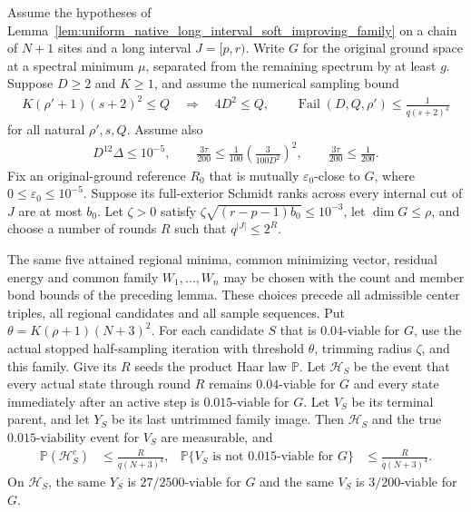 \begin{lemma}
    \label{lem:physical_soft_interval_history}
    \leanok
    Assume the hypotheses of
    Lemma~\ref{lem:uniform_native_long_interval_soft_improving_family}
    on a chain of $N+1$ sites and a long interval $J=[p,r)$.
    Write $G$ for the original ground space at a spectral minimum $\mu$,
    separated from the remaining spectrum by at least $g$.
    Suppose $D\ge2$ and $K\ge1$, and assume the numerical sampling bound
    \begin{align}
        K(\rho'+1)(s+2)^2\le Q\quad\Longrightarrow\quad
        4D^2\le Q,\qquad
        \operatorname{Fail}(D,Q,\rho')\le\frac{1}{q(s+2)^4}
        \label{eq:physical_interval_sampling_threshold}
    \end{align}
    for all natural $\rho',s,Q$. Assume also
    \begin{align}
        D^{12}\Delta\le10^{-5},\qquad
        \frac{3\tau}{200}\le
        \frac1{100}\left(\frac{3}{100D^2}\right)^2,
        \qquad \frac{3\tau}{200}\le\frac1{200}.
    \end{align}
    Fix an original-ground reference $R_0$ that is mutually
    $\varepsilon_0$-close to $G$, where
    $0\le\varepsilon_0\le10^{-5}$. Suppose its full-exterior Schmidt ranks
    across every internal cut of $J$ are at most $b_0$.
    Let $\zeta>0$ satisfy
    $\zeta\sqrt{(r-p-1)b_0}\le10^{-3}$, let $\dim G\le\rho$,
    and choose a number of rounds $R$ such that
    $q^{|J|}\le2^R$.

    The same five attained regional minima, common minimizing vector,
    residual energy and common family $W_1,\ldots,W_n$ may be chosen
    with the count and member bond bounds of the preceding lemma.
    These choices precede all admissible center triples, all regional
    candidates and all sample sequences. Put
    $\theta=K(\rho+1)(N+3)^2$. For each candidate $S$ that is
    $0.04$-viable for $G$, use the actual stopped half-sampling iteration
    with threshold $\theta$, trimming radius $\zeta$, and this family.
    Give its $R$ seeds the product Haar law $\mathbb P$.
    Let $\mathcal H_S$ be the event that every actual state through
    round $R$ remains $0.04$-viable for $G$ and every state immediately
    after an active step is $0.015$-viable for $G$. Let $V_S$ be its terminal
    parent, and let $Y_S$ be its last untrimmed family image.
    Then $\mathcal H_S$ and the true $0.015$-viability event for $V_S$
    are measurable, and
    \begin{align}
        \mathbb P(\mathcal H_S^c) & \le\frac{R}{q(N+3)^4}, &
        \mathbb P\{V_S\text{ is not }0.015\text{-viable for }G\}
                                  & \le\frac{R}{q(N+3)^4}.
    \end{align}
    On $\mathcal H_S$, the same $Y_S$ is $27/2500$-viable for $G$
    and the same $V_S$ is $3/200$-viable for $G$.


\end{lemma}
